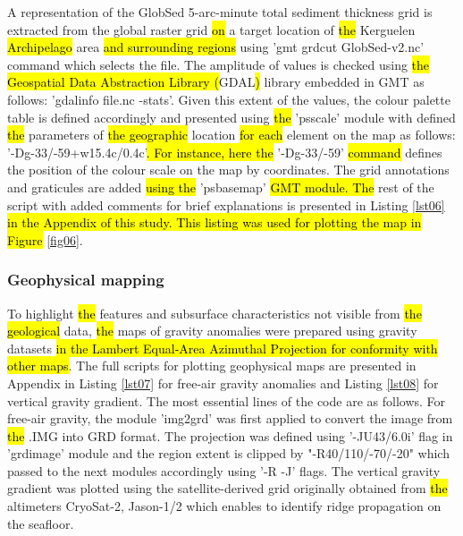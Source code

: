 \documentclass[geomatics,article,submit,pdftex,moreauthors]{Definitions/mdpi}
\begin{document}
A representation of the GlobSed 5-arc-minute total sediment thickness grid is extracted from the global raster grid \hl{on} a target location of \hl{the }Kerguelen \hl{Archipelago }area \hl{and surrounding regions }using 'gmt grdcut GlobSed-v2.nc' command which selects the file. The amplitude of values is checked using \hl{the Geospatial Data Abstraction Library (}GDAL\hl{)} library embedded in GMT as follows: 'gdalinfo file.nc -stats'. Given this extent of the values, the colour palette table is defined accordingly and presented using \hl{the }'psscale' module with defined \hl{the }parameters of \hl{the geographic }location \hl{for each} element on the map as follows: '-Dg-33/-59+w15.4c/0.4c'\hl{. For instance, here the} '-Dg-33/-59' \hl{command} defines the position of the colour scale on the map by coordinates. The grid annotations and graticules are added \hl{using the} 'psbasemap' \hl{GMT module. The} rest of the script with added comments for brief explanations is presented in Listing \ref{lst06} \hl{in the Appendix of this study. This listing was used for plotting the map in Figure} \ref{fig06}. 

\subsubsection{Geophysical mapping}

To highlight \hl{the }features and subsurface characteristics not visible from \hl{the geological }data, \hl{the }maps of gravity anomalies were prepared using gravity datasets \hl{in the Lambert Equal-Area Azimuthal Projection for conformity with other maps}. The full scripts for plotting geophysical maps are presented in Appendix in Listing \ref{lst07} for free-air gravity anomalies and Listing \ref{lst08} for vertical gravity gradient. The most essential lines of the code are as follows. For free-air gravity, the module 'img2grd' was first applied to convert the image from \hl{the} .IMG into GRD format. The projection was defined using '-JU43/6.0i' flag in 'grdimage' module and the region extent is clipped by "-R40/110/-70/-20" which passed to the next modules accordingly using '-R -J' flags. The vertical gravity gradient was plotted using the satellite-derived grid originally obtained from \hl{the }altimeters CryoSat-2, Jason-1/2 \cite{Harper} which enables to identify ridge propagation on the seafloor.
\end{document}
